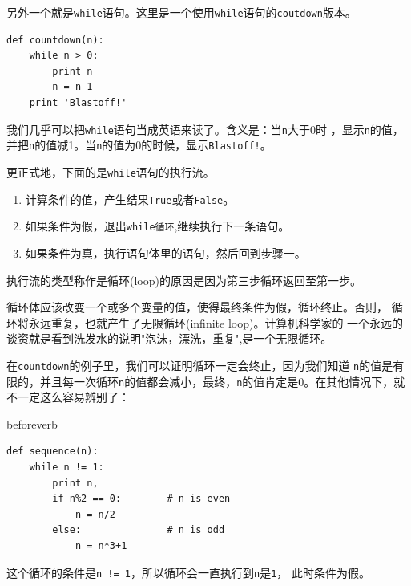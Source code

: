 另外一个就是{\tt while}语句。这里是一个使用{\tt while}语句的{\tt coutdown}版本。

\beforeverb
\begin{verbatim}
def countdown(n):
    while n > 0:
        print n
        n = n-1
    print 'Blastoff!'
\end{verbatim}
\afterverb

我们几乎可以把{\tt while}语句当成英语来读了。含义是：当{\tt n}大于0时
，显示{\tt n}的值，并把{\tt n}的值减1。当{\tt n}的值为0的时候，显示{\tt Blastoff!}。


更正式地，下面的是{\tt while}语句的执行流。

\begin{enumerate}

\item 计算条件的值，产生结果{\tt True}或者{\tt False}。

\item 如果条件为假，退出{\tt while循环},继续执行下一条语句。

\item 如果条件为真，执行语句体里的语句，然后回到步骤一。

\end{enumerate}

执行流的类型称作是循环(loop)的原因是因为第三步循环返回至第一步。


循环体应该改变一个或多个变量的值，使得最终条件为假，循环终止。否则，
循环将永远重复，也就产生了无限循环(infinite loop)。计算机科学家的
一个永远的谈资就是看到洗发水的说明"泡沫，漂洗，重复",是一个无限循环。


在{\tt countdown}的例子里，我们可以证明循环一定会终止，因为我们知道
{\tt n}的值是有限的，并且每一次循环{\tt n}的值都会减小，最终，{\tt n}的值肯定是0。在其他情况下，就不一定这么容易辨别了：

beforeverb
\begin{verbatim}
def sequence(n):
    while n != 1:
        print n,
        if n%2 == 0:        # n is even
            n = n/2
        else:               # n is odd
            n = n*3+1
\end{verbatim}
\afterverb

这个循环的条件是{\tt n != 1}，所以循环会一直执行到{\tt n}是{\tt 1}，
此时条件为假。\\

